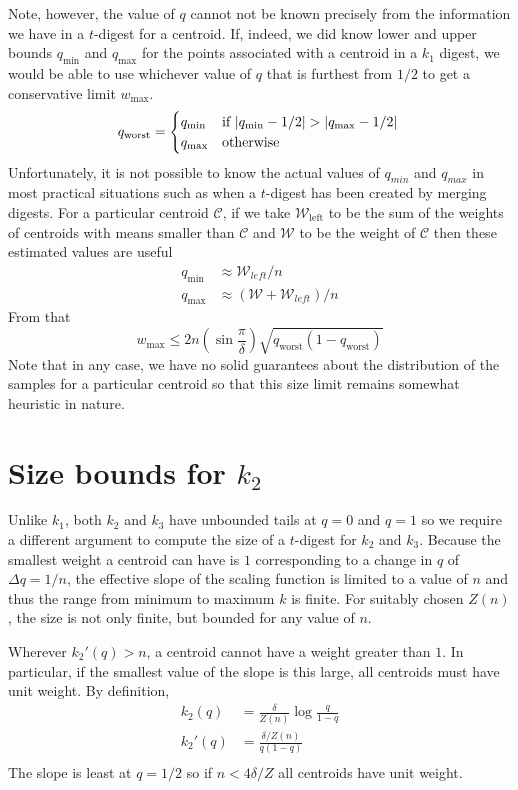 \documentclass[11pt]{amsart}
\begin{document}
Note, however, the value of $q$ cannot not be known precisely from the information we have in a $t$-digest for a centroid. If, indeed, we did know lower and upper bounds $q_{\min}$ and $q_{\max}$ for the points associated with a centroid in a $k_1$ digest, we would be able to use whichever value of $q$ that is furthest from $1/2$ to get a conservative limit $w_{\max}$.
\[
q_{\text {worst}} = \begin{cases}
 q_{\min} & \text{if } | q_{\min} - 1/2 | > | q_{\max} - 1/2 | \\
 q_{\max} & \text {otherwise}
\end{cases} \\
\]
Unfortunately, it is not possible to know the actual values of $q_{min}$ and $q_{max}$ in most practical situations such as when a $t$-digest has been created by merging digests. For a particular centroid $\mathcal C$, if we take $\mathcal W_{\text {left}}$ to be the sum of the weights of centroids with means smaller than $\mathcal C$ and $\mathcal W$ to be the weight of $\mathcal C$ then these estimated values are useful
\[
\begin{aligned}
q_{\min} &\approx {\mathcal W_{left}} / n \\
q_{\max} &\approx (\mathcal W + \mathcal W_{left}) / n  
\end{aligned}
\]
From that 
\[
w_{\max} \le 2n \left( \sin \frac \pi \delta\right) \sqrt{q_{\text {worst}} (1-q_{\text {worst}})}
\]
Note that in any case, we have no solid guarantees about the distribution of the samples for a particular centroid so that this size limit remains somewhat heuristic in nature.
\section{Size bounds for $k_2$}
Unlike $k_1$, both $k_2$ and $k_3$ have unbounded tails at $q=0$ and $q=1$ so we require a different argument to compute the size of a $t$-digest for $k_2$ and $k_3$. Because the smallest weight a centroid can have is $1$ corresponding to a change in $q$ of $\Delta q = 1/n$, the effective slope of the scaling function is limited to a value of $n$ and thus the range from minimum to maximum $k$  is finite. For suitably chosen  $Z(n)$, the size is not only finite, but bounded for any value of $n$.

Wherever $k_2'(q) > n$, a centroid cannot have a weight greater than $1$. In particular, if the smallest value of the slope is this large, all centroids must have unit weight. By definition,
\[
\begin{aligned}
k_2(q) &= \frac \delta {Z(n)} \log {\frac q {1-q}} \\
k_2'(q) &= {\frac  {\delta/Z(n)} {q (1-q) }  } \\
\end{aligned}
\]
The slope is least at $q=1/2$ so if $ n < 4  \delta / Z$ all centroids have unit weight.
\end{document}

